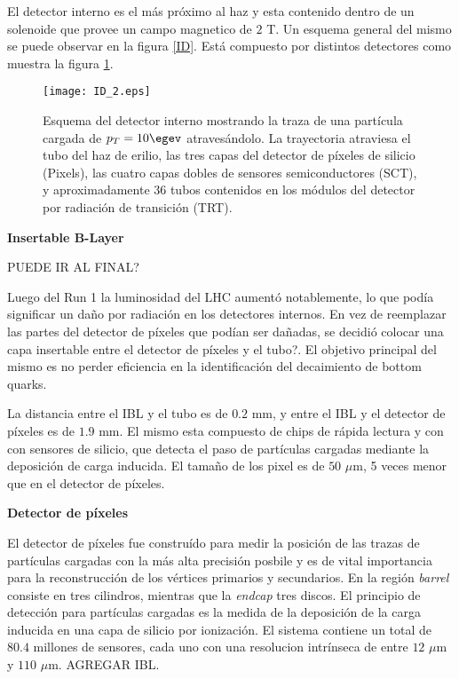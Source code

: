 El detector interno es el más próximo al haz y esta contenido dentro de un solenoide que provee un campo magnetico de $2$ T. Un esquema general del mismo se puede observar en la figura \ref{ID}. Está compuesto por distintos detectores como muestra la figura \ref{ID_2}.

\begin{figure}
\centering
\texttt{[image: ID\_2.eps]}
\caption{Esquema del detector interno mostrando la traza de una partícula cargada de $p_{T}=10\egev$ atravesándolo. La trayectoria atraviesa el tubo del haz de  erilio, las tres capas del detector de píxeles de silicio (Pixels), las cuatro capas dobles de sensores semiconductores (SCT), y aproximadamente 36 tubos contenidos en los módulos del detector por radiación de transición (TRT).}
\label{ID_2}
\end{figure}
\vspace{0.5cm}

{\bf Insertable B-Layer}

PUEDE IR AL FINAL?

Luego del Run 1 la luminosidad del LHC aumentó notablemente, lo que podía significar un daño por radiación en los detectores internos. En vez de reemplazar las partes del detector de píxeles que podían ser dañadas, se decidió colocar una capa insertable entre el detector de píxeles y el tubo?. El objetivo principal del mismo es no perder eficiencia en la identificación del decaimiento de bottom quarks.

La distancia entre el IBL y el tubo es de $0.2$ mm, y entre el IBL y el detector de píxeles es de $1.9$ mm. El mismo esta compuesto de chips de rápida lectura y con con sensores de silicio, que detecta el paso de partículas cargadas mediante la deposición de carga inducida. El tamaño de los pixel es de $50$ $\mu$m, 5 veces menor que en el detector de píxeles.

\vspace{0.5cm}

{\bf Detector de píxeles }

El detector de píxeles fue construído para medir la posición de las trazas de partículas cargadas con la más alta precisión posbile y es de vital importancia para la reconstrucción de los vértices primarios y secundarios. En la región \textit{barrel} consiste en tres cilindros, mientras que la \textit{endcap} tres discos. El principio de detección para partículas cargadas es la medida de la deposición de la carga inducida en una capa de silicio por ionización. El sistema contiene un total de $80.4$ millones de sensores, cada uno con una resolucion intrínseca de entre $12$ $\mu$m y $110$ $\mu$m. AGREGAR IBL.

